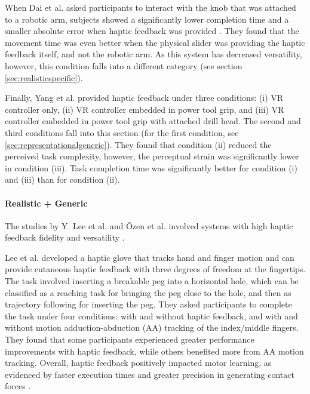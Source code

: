 When Dai et al. asked participants to interact with the knob that was attached to a robotic arm, subjects showed a significantly lower completion time and a smaller absolute error when haptic feedback was provided \cite{Dai2023}. They found that the movement time was even better when the physical slider was providing the haptic feedback itself, and not the robotic arm. As this system has decreased versatility, however, this condition falls into a different category (see section \ref{sec:realisticspecific}). 

Finally, Yang et al. provided haptic feedback under three conditions: (i) VR controller only, (ii) VR controller embedded in power tool grip, and (iii) VR controller embedded in power tool grip with attached drill head. The second and third conditions fall into this section (for the first condition, see \ref{sec:representationalgeneric}). They found that condition (ii) reduced the perceived task complexity, however, the perceptual strain was significantly lower in condition (iii). Task completion time was significantly better for condition (i) and (iii) than for condition (ii).


\paragraph{Realistic + Generic} \label{sec:realisticgeneric}
The studies by Y. Lee et al. and Özen et al. involved systems with high haptic feedback fidelity and versatility \cite{LeeY2019, Oezen2022}. 

Lee et al. developed a haptic glove that tracks hand and finger motion and can provide cutaneous haptic feedback with three degrees of freedom at the fingertips. The task involved inserting a breakable peg into a horizontal hole, which can be classified as a reaching task for bringing the peg close to the hole, and then as trajectory following for inserting the peg. They asked participants to complete the task under four conditions: with and without haptic feedback, and with and without motion adduction-abduction (AA) tracking of the index/middle fingers. They found that some participants experienced greater performance improvements with haptic feedback, while others benefited more from AA motion tracking. Overall, haptic feedback positively impacted motor learning, as evidenced by faster execution times and greater precision in generating contact forces \cite{LeeY2019}.


